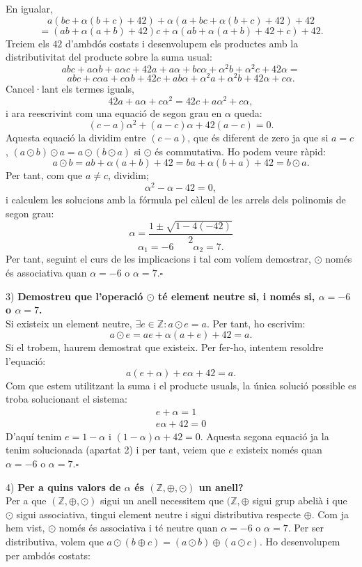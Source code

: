 \documentclass[11pt]{article}
\begin{document}
\begin{legal}
\begin{legal}
\begin{itemize}
		\end{itemize}
		En igualar,
		$$
		a(bc+\alpha(b+c)+42)+\alpha(a+bc+\alpha(b+c)+42)+42
		$$
		$$
		=(ab+\alpha(a+b)+42)c+\alpha(ab+\alpha(a+b)+42+c)+42.
		$$
		Treiem els $42$ d'ambdós costats i desenvolupem els productes amb la distributivitat del producte sobre la suma usual:
		$$
		abc+a\alpha b+a\alpha c+42a+a\alpha+bc\alpha+\alpha^2b+\alpha^2c+42\alpha=
		$$
		$$
		abc+c\alpha a+c\alpha b+42c+ab\alpha+\alpha^2a+\alpha^2b+42\alpha+c\alpha.
		$$
		Cancel·lant els termes iguals,
		$$
		42a+a\alpha +c\alpha^2=42c+a\alpha^2+c\alpha,
		$$
		i ara reescrivint com una equació de segon grau en $\alpha$ queda:
		$$
		(c-a)\alpha^2+(a-c)\alpha+42(a-c)=0.
		$$
		Aquesta equació la dividim entre $(c-a)$, que és diferent de zero ja que si $a=c$, $(a\odot b)\odot a=a\odot(b\odot a)$ si $\odot$ és commutativa. Ho podem veure ràpid:
		$$a\odot b=ab+\alpha(a+b)+42=ba+\alpha(b+a)+42=b\odot a.$$
		Per tant, com que $a\neq c$, dividim;
		$$
		\alpha^2-\alpha-42=0,
		$$
		i calculem les solucions amb la fórmula pel càlcul de les arrels dels polinomis de segon grau:
		$$
		\alpha=\dfrac{1\pm\sqrt{1-4(-42)}}{2}
		$$
		$$
		\alpha_1=-6\qquad\alpha_2=7.
		$$
		Per tant, seguint el curs de les implicacions i tal com volíem demostrar, $\odot$ només és associativa quan $\alpha=-6$ o $\alpha=7$.$\square$
		\item[3)] \textbf{Demostreu que l'operació $\odot$ té element neutre si, i només si, $\alpha=-6$ o $\alpha=7$.}\\
		Si existeix un element neutre, $\exists e\in\mathbb{Z}:a\odot e=a$. Per tant, ho escrivim:
		$$a\odot e=ae+\alpha(a+e)+42=a.$$
		Si el trobem, haurem demostrat que existeix. Per fer-ho, intentem resoldre l'equació:
		$$a(e+\alpha)+e\alpha+42=a.$$
		Com que estem utilitzant la suma i el producte usuals, la única solució possible es troba solucionant el sistema:
		\[		
		\begin{array}{rcl}
			e+\alpha=1\\
			e\alpha+42=0
		\end{array}
		\]
		D'aquí tenim $e=1-\alpha$ i $(1-\alpha)\alpha+42=0$. Aquesta segona equació ja la tenim solucionada (apartat 2) i per tant, veiem que $e$ existeix només quan $\alpha=-6$ o $\alpha=7$.$\square$
		\item[4)] \textbf{Per a quins valors de $\alpha$ és $(\mathbb{Z},\oplus,\odot)$ un anell?}\\
		Per a que $(\mathbb{Z},\oplus,\odot)$ sigui un anell necessitem que $(\mathbb{Z},\oplus$ sigui grup abelià i que $\odot$ sigui associativa, tingui element neutre i sigui distributiva respecte $\oplus$. Com ja hem vist, $\odot$ només és associativa i té neutre quan $\alpha=-6$ o $\alpha=7$. Per ser distributiva, volem que $a\odot(b\oplus c)=(a\odot b)\oplus(a\odot c)$. Ho desenvolupem per ambdós costats:

\end{legal}
\end{legal}
\end{document}
